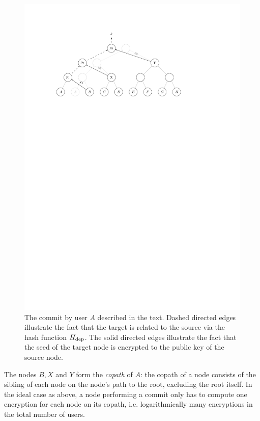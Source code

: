 \begin{figure}
	\begin{center}
		\includegraphics{figures/treekem-simple-update}
	\end{center}
	\caption{The commit by user $A$ described in the text. Dashed directed edges illustrate the fact that the target is related to the source via the hash function  $H_\mathrm{dep}$. The solid directed edges illustrate the fact that the seed of the target node is encrypted to the public key of the source node.}\label{fig:treekem-simple-update}
\end{figure}

The nodes $B, X$ and $Y$ form the \emph{copath} of $A$: the copath of a node consists of the sibling of each node on the node's path to the root, excluding the root itself. In the ideal case as above, a node performing a commit only has to compute one encryption for each node on its copath, i.e. logarithmically many encryptions in the total number of users.

